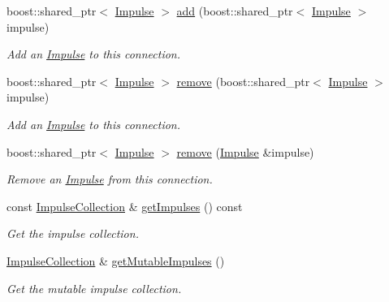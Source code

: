 \begin{DoxyCompactItemize}
boost\-::shared\-\_\-ptr$<$ \hyperlink{classcryomesh_1_1components_1_1Impulse}{\-Impulse} $>$ \hyperlink{classcryomesh_1_1components_1_1Connection_a620d9f0f12df818c675c258470887240}{add} (boost\-::shared\-\_\-ptr$<$ \hyperlink{classcryomesh_1_1components_1_1Impulse}{\-Impulse} $>$ impulse)
\begin{DoxyCompactList}\small\item\em \-Add an \hyperlink{classcryomesh_1_1components_1_1Impulse}{\-Impulse} to this connection. \end{DoxyCompactList}\item 
boost\-::shared\-\_\-ptr$<$ \hyperlink{classcryomesh_1_1components_1_1Impulse}{\-Impulse} $>$ \hyperlink{classcryomesh_1_1components_1_1Connection_a6c38044760c9b4a677709c41c633dc4a}{remove} (boost\-::shared\-\_\-ptr$<$ \hyperlink{classcryomesh_1_1components_1_1Impulse}{\-Impulse} $>$ impulse)
\begin{DoxyCompactList}\small\item\em \-Add an \hyperlink{classcryomesh_1_1components_1_1Impulse}{\-Impulse} to this connection. \end{DoxyCompactList}\item 
boost\-::shared\-\_\-ptr$<$ \hyperlink{classcryomesh_1_1components_1_1Impulse}{\-Impulse} $>$ \hyperlink{classcryomesh_1_1components_1_1Connection_abaf8a91eab3a7b5d943fe3f5818f2a39}{remove} (\hyperlink{classcryomesh_1_1components_1_1Impulse}{\-Impulse} \&impulse)
\begin{DoxyCompactList}\small\item\em \-Remove an \hyperlink{classcryomesh_1_1components_1_1Impulse}{\-Impulse} from this connection. \end{DoxyCompactList}\item 
const \hyperlink{classcryomesh_1_1components_1_1ImpulseCollection}{\-Impulse\-Collection} \& \hyperlink{classcryomesh_1_1components_1_1Connection_aacfec7d5bedc59b5b5bb72565767c705}{get\-Impulses} () const 
\begin{DoxyCompactList}\small\item\em \-Get the impulse collection. \end{DoxyCompactList}\item 
\hyperlink{classcryomesh_1_1components_1_1ImpulseCollection}{\-Impulse\-Collection} \& \hyperlink{classcryomesh_1_1components_1_1Connection_a42ad2f54cf156ba270d4fb9ed10113db}{get\-Mutable\-Impulses} ()
\begin{DoxyCompactList}\small\item\em \-Get the mutable impulse collection. \end{DoxyCompactList}\item 

\end{DoxyCompactItemize}
